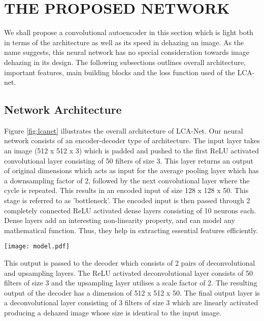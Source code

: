 \documentclass[conference]{IEEEtran}
\begin{document}
\section{THE PROPOSED NETWORK}
We shall propose a convolutional autoencoder in this section which is light both in terms of the architecture as well as its speed in dehazing an image. As the name suggests, this neural network has no special consideration towards image dehazing in its design. The following subsections outlines overall architecture, important features, main building blocks and the loss function used of the LCA-net.

\subsection{    Network Architecture}\label{AA}
Figure \ref{fig:lcanet} illustrates the overall architecture of LCA-Net. Our neural network consists of an encoder-decoder type of architecture. The input layer takes an image (512 x 512 x 3) which is padded and pushed to the first ReLU \cite{maas2013rectifier} activated convolutional layer consisting of 50 filters of size 3. This layer returns an output of original dimensions which acts as input for the average pooling layer which has a downsampling factor of 2, followed by the next convolutional layer where the cycle is repeated. This results in an encoded input of size 128 x 128 x 50.
This stage is referred to as 'bottleneck'. The encoded input is then passed through 2 completely connected ReLU \cite{maas2013rectifier} activated dense layers consisting of 10 neurons each. Dense layers add an interesting non-linearity property, and can model any mathematical function. Thus, they help in extracting essential features efficiently.
\begin{figure*}[ht]
\captionsetup{justification=centering}
\centerline{\texttt{[image: model.pdf]}}
\caption{The architecture of LCA-Net}
\label{fig:lcanet}
\end{figure*}
This output is passed to the decoder which consists of 2 pairs of deconvolutional and upsampling layers. The ReLU\cite{maas2013rectifier} activated deconvolutional layer consists of 50 filters of size 3 and the upsampling layer utilises a scale factor of 2.
The resulting output of the decoder has a dimension of 512 x 512 x 50. The final output layer is a deconvolutional layer consisting of 3 filters of size 3 which are linearly activated producing a dehazed image whose size is identical to the input image.
\end{document}
